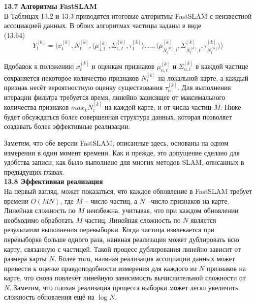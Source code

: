 \documentclass[10pt,a4paper]{article}
\begin{document}
\textbf{13.7	Алгоритмы FastSLAM} \\

В Таблицах 13.2 и 13.3 приводятся итоговые алгоритмы FastSLAM с неизвестной ассоциацией данных. В обоих алгоритмах частицы заданы в виде\\

(13.64)
$$Y_t^{[k]}=\langle x_t^{[k]},N_t^{[k]},\langle\mu_{1,t}^{[k]},\varSigma_{1,t}^{[k]},\tau_1^{[k]}\rangle,...,\langle\mu_{N_t^{[k]},t}^{[k]},\varSigma_{N_t^{[k]},t}^{[k]},\tau_{N_t^{[k]}}^{[k]}\rangle\rangle$$

Вдобавок к положению $x_t^{[k]}$ и оценкам признаков $\mu_{n,t}^{[k]}$  и $\varSigma_{n,t}^{[k]}$ в каждой частице сохраняется некоторое количество признаков $N_t^{[k]}$ на локальной карте, а каждый признак несёт вероятностную оценку существования $\tau_n^{[k]}$. Для выполнения итерации фильтра требуется время, линейно зависящее от максимального количества признаков $max_k N_t^{[k]}$ на каждой карте, и от числа частиц $M$. Ниже будет обсуждаться более совершенная структура данных, которая позволяет создавать более эффективные реализации.

Заметим, что обе версии FastSLAM, описанные здесь, основаны на одном измерении в один момент времени. Как и прежде, это допущение сделано для удобства записи, как было выполнено для многих методов SLAM, описанных в предыдущих главах.\\

\textbf{13.8	Эффективная реализация}\\

На первый взгляд, может показаться, что каждое обновление в FastSLAM требует времени $O(MN)$, где $M$ – число частиц, а $N$ –число признаков на карте. Линейная сложность по $M$ неизбежна, учитывая, что при каждом обновлении необходимо обработать $M$ частиц. Линейная сложность по $N$ является результатом выполнения перевыборки. Когда частица извлекается при перевыборке больше одного раза, наивная реализация может дублировать всю карту, связанную с частицей. Такой процесс дублирования линейно зависит от размера карты $N$. Более того, наивная реализация ассоциации данных может привести к оценке правдоподобности измерения для каждого из $N$ признаков на карте, что снова повлечёт линейную зависимость вычислительной сложности от $N$. Заметим, что плохая реализация процесса выборки может легко увеличить сложность обновления ещё на $\log N$.\\
\end{document}
